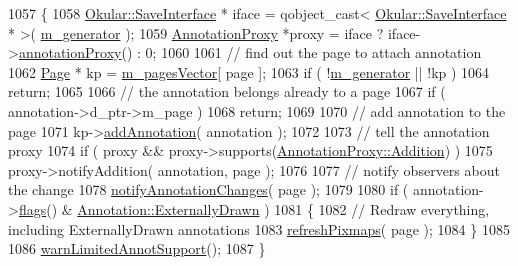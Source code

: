 \begin{DoxyCode}
1057 \{
1058     \hyperlink{classOkular_1_1SaveInterface}{Okular::SaveInterface} * iface = qobject\_cast< 
      \hyperlink{classOkular_1_1SaveInterface}{Okular::SaveInterface} * >( \hyperlink{classOkular_1_1DocumentPrivate_a52083f79ce95756ddea060e74315e91f}{m\_generator} );
1059     \hyperlink{classOkular_1_1AnnotationProxy}{AnnotationProxy} *proxy = iface ? iface->\hyperlink{classOkular_1_1SaveInterface_a1fdb82695d9758e9e68ab0129bf16237}{annotationProxy}() : 0;
1060 
1061     \textcolor{comment}{// find out the page to attach annotation}
1062     \hyperlink{classOkular_1_1Page}{Page} * kp = \hyperlink{classOkular_1_1DocumentPrivate_a73b852d9a73ffe8061b66dbf9b290f17}{m\_pagesVector}[ page ];
1063     \textcolor{keywordflow}{if} ( !\hyperlink{classOkular_1_1DocumentPrivate_a52083f79ce95756ddea060e74315e91f}{m\_generator} || !kp )
1064         \textcolor{keywordflow}{return};
1065 
1066     \textcolor{comment}{// the annotation belongs already to a page}
1067     \textcolor{keywordflow}{if} ( annotation->d\_ptr->m\_page )
1068         \textcolor{keywordflow}{return};
1069 
1070     \textcolor{comment}{// add annotation to the page}
1071     kp->\hyperlink{classOkular_1_1Page_a8730d8d4d0072467dc9407c7fc177b8a}{addAnnotation}( annotation );
1072 
1073     \textcolor{comment}{// tell the annotation proxy}
1074     \textcolor{keywordflow}{if} ( proxy && proxy->supports(\hyperlink{classOkular_1_1AnnotationProxy_ae89e16435aa7e10ac4089e673f44e543afd5f00fa1edfb9d2043f90f9938cee3a}{AnnotationProxy::Addition}) )
1075         proxy->notifyAddition( annotation, page );
1076 
1077     \textcolor{comment}{// notify observers about the change}
1078     \hyperlink{classOkular_1_1DocumentPrivate_a1ca2b2788a81ae1bf852d5eab1de541c}{notifyAnnotationChanges}( page );
1079 
1080     \textcolor{keywordflow}{if} ( annotation->\hyperlink{classOkular_1_1Annotation_a3d6f7ee5057155b90e76c24768880947}{flags}() & \hyperlink{classOkular_1_1Annotation_a8a214541446745761efeda70b3a4302ea75f088f5533ace9d9d47a506b707f5a1}{Annotation::ExternallyDrawn} )
1081     \{
1082         \textcolor{comment}{// Redraw everything, including ExternallyDrawn annotations}
1083         \hyperlink{classOkular_1_1DocumentPrivate_a2de4027c4556e563bb24d465aa6ce5a6}{refreshPixmaps}( page );
1084     \}
1085 
1086     \hyperlink{classOkular_1_1DocumentPrivate_abfb2abf66a3eb0536063c818a8e793e9}{warnLimitedAnnotSupport}();
1087 \}
\end{DoxyCode}
